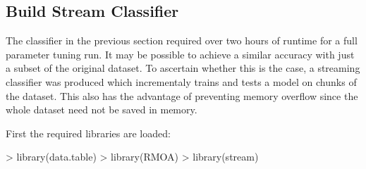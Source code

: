 \documentclass[10pt]{article}
\begin{document}
\subsection{Build Stream Classifier}

The classifier in the previous section required over two hours of runtime for a full parameter tuning run. It may be possible to achieve a similar accuracy with just a subset of the original dataset. To ascertain whether this is the case, a streaming classifier was produced which incrementaly trains and tests a model on chunks of the dataset. This also has the advantage of preventing memory overflow since the whole dataset need not be saved in memory.

First the required libraries are loaded:
\begin{Schunk}
\begin{Sinput}
> library(data.table)
> library(RMOA)
> library(stream)
\end{Sinput}
\end{Schunk}
\end{document}
